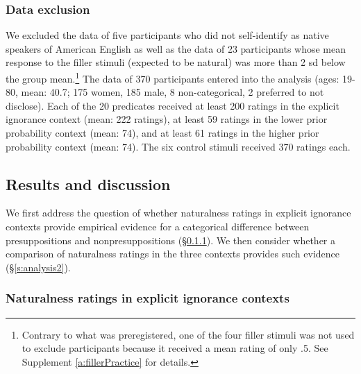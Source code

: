 \documentclass[11pt,fleqn]{article}
\newcommand{\6}{\mbox{$[\hspace*{-.6mm}[$}}
\newcommand{\9}{\mbox{$]\hspace*{-.6mm}]$}}
\begin{document}
\subsubsection{Data exclusion} 

We excluded the data of five participants who did not self-identify as native speakers of American English as well as the data of 23 participants whose mean response to the filler stimuli (expected to be natural) was more than 2 sd below the group mean.\footnote{Contrary to what was preregistered, one of the four filler stimuli was not used to exclude participants because it received a mean rating of only .5. See Supplement \ref{a:fillerPractice} for details.} The data of 370 participants entered into the analysis (ages: 19-80, mean: 40.7; 175 women, 185 male, 8 non-categorical, 2 preferred to not disclose). Each of the 20 predicates received at least 200 ratings in the explicit ignorance context (mean: 222 ratings), at least 59 ratings in the lower prior probability context (mean: 74), and at least 61 ratings in the higher prior probability context (mean: 74). The six control stimuli received 370 ratings each. 

\subsection{Results and discussion}

We first address the question of whether naturalness ratings in explicit ignorance contexts provide empirical evidence for a categorical difference between presuppositions and nonpresuppositions (\S\ref{s:analysis1}). We then consider whether a comparison of naturalness ratings in the three contexts provides such evidence (\S\ref{s:analysis2}).

\subsubsection{Naturalness ratings in explicit ignorance contexts}\label{s:analysis1}
\end{document}
